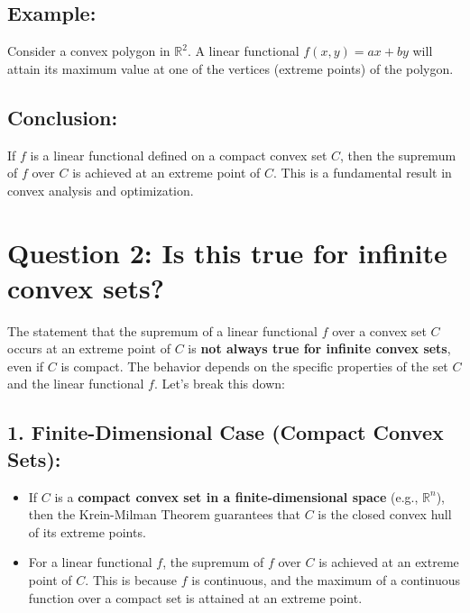 \documentclass{article}
\begin{document}
\subsection*{Example:}
Consider a convex polygon in \( \mathbb{R}^2 \). A linear functional \( f(x, y) = ax + by \) will attain its maximum value at one of the vertices (extreme points) of the polygon.

\subsection*{Conclusion:}
If \( f \) is a linear functional defined on a compact convex set \( C \), then the supremum of \( f \) over \( C \) is achieved at an extreme point of \( C \). This is a fundamental result in convex analysis and optimization.

\section*{Question 2: Is this true for infinite convex sets?}

The statement that the supremum of a linear functional \( f \) over a convex set \( C \) occurs at an extreme point of \( C \) is \textbf{not always true for infinite convex sets}, even if \( C \) is compact. The behavior depends on the specific properties of the set \( C \) and the linear functional \( f \). Let's break this down:

\subsection*{1. Finite-Dimensional Case (Compact Convex Sets):}
\begin{itemize}
    \item If \( C \) is a \textbf{compact convex set in a finite-dimensional space} (e.g., \( \mathbb{R}^n \)), then the Krein-Milman Theorem guarantees that \( C \) is the closed convex hull of its extreme points.
    \item For a linear functional \( f \), the supremum of \( f \) over \( C \) is achieved at an extreme point of \( C \). This is because \( f \) is continuous, and the maximum of a continuous function over a compact set is attained at an extreme point.
\end{itemize}
\end{document}
